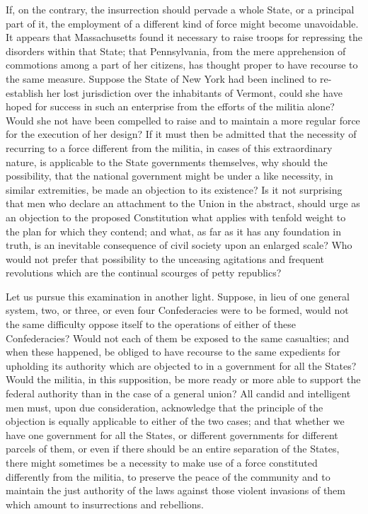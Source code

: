 If, on the contrary, the insurrection should pervade a whole State, or a principal part of it, the employment of a different kind of force might become unavoidable. It appears that Massachusetts found it necessary to raise troops for repressing the disorders within that State; that Pennsylvania, from the mere apprehension of commotions among a part of her citizens, has thought proper to have recourse to the same measure. Suppose the State of New York had been inclined to re-establish her lost jurisdiction over the inhabitants of Vermont, could she have hoped for success in such an enterprise from the efforts of the militia alone? Would she not have been compelled to raise and to maintain a more regular force for the execution of her design? If it must then be admitted that the necessity of recurring to a force different from the militia, in cases of this extraordinary nature, is applicable to the State governments themselves, why should the possibility, that the national government might be under a like necessity, in similar extremities, be made an objection to its existence? Is it not surprising that men who declare an attachment to the Union in the abstract, should urge as an objection to the proposed Constitution what applies with tenfold weight to the plan for which they contend; and what, as far as it has any foundation in truth, is an inevitable consequence of civil society upon an enlarged scale? Who would not prefer that possibility to the unceasing agitations and frequent revolutions which are the continual scourges of petty republics?

Let us pursue this examination in another light. Suppose, in lieu of one general system, two, or three, or even four Confederacies were to be formed, would not the same difficulty oppose itself to the operations of either of these Confederacies? Would not each of them be exposed to the same casualties; and when these happened, be obliged to have recourse to the same expedients for upholding its authority which are objected to in a government for all the States? Would the militia, in this supposition, be more ready or more able to support the federal authority than in the case of a general union? All candid and intelligent men must, upon due consideration, acknowledge that the principle of the objection is equally applicable to either of the two cases; and that whether we have one government for all the States, or different governments for different parcels of them, or even if there should be an entire separation of the States, there might sometimes be a necessity to make use of a force constituted differently from the militia, to preserve the peace of the community and to maintain the just authority of the laws against those violent invasions of them which amount to insurrections and rebellions.

